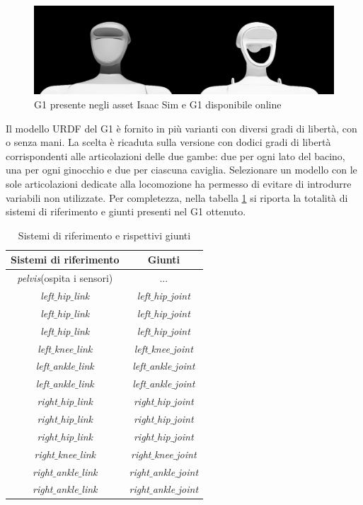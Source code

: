\begin{figure}[h]
    \centering
    \includegraphics[width=0.75\linewidth]{immagini/g1_versions.png}
    \caption{G1 presente negli asset Isaac Sim e G1 disponibile online}
    \label{fig:confronto_g1}
\end{figure}

Il modello URDF del G1 è fornito in più varianti con diversi gradi di libertà, con o senza mani. La scelta è ricaduta sulla versione con dodici gradi di libertà corrispondenti alle articolazioni delle due gambe: due per ogni lato del bacino, una per ogni ginocchio e due per ciascuna caviglia. Selezionare un modello con le sole articolazioni dedicate alla locomozione ha permesso di evitare di introdurre variabili non utilizzate. Per completezza, nella tabella \ref{tab:g1_joint_link} si riporta la totalità di sistemi di riferimento e giunti presenti nel G1 ottenuto.

\begin{table}[h]
    \centering
    \begin{tabular}{|c|c|} 
        \hline
        \textbf{Sistemi di riferimento}& \textbf{Giunti}\\ \hline
        \textit{pelvis}(ospita i sensori)& ...\\ \hline
        \textit{left$\_$hip$\_$link}&\textit{left$\_$hip$\_$joint} \\ \hline
        \textit{left$\_$hip$\_$link}&\textit{left$\_$hip$\_$joint} \\ \hline
        \textit{left$\_$hip$\_$link}& \textit{left$\_$hip$\_$joint}\\ \hline
        \textit{left$\_$knee$\_$link}& \textit{left$\_$knee$\_$joint}\\ \hline
        \textit{left$\_$ankle$\_$link}& \textit{left$\_$ankle$\_$joint}\\ \hline
        \textit{left$\_$ankle$\_$link}& \textit{left$\_$ankle$\_$joint}\\ \hline
        \textit{right$\_$hip$\_$link}& \textit{right$\_$hip$\_$joint}\\ \hline
        \textit{right$\_$hip$\_$link}& \textit{right$\_$hip$\_$joint}\\ \hline
        \textit{right$\_$hip$\_$link}& \textit{right$\_$hip$\_$joint}\\ \hline
        \textit{right$\_$knee$\_$link}& \textit{right$\_$knee$\_$joint}\\ \hline
        \textit{right$\_$ankle$\_$link}& \textit{right$\_$ankle$\_$joint}\\ \hline
        \textit{right$\_$ankle$\_$link}& \textit{right$\_$ankle$\_$joint}\\ \hline
    \end{tabular}
    \caption{Sistemi di riferimento e rispettivi giunti}
    \label{tab:g1_joint_link}
\end{table}

